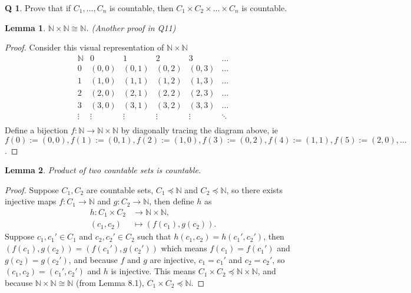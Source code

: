 \documentclass[12pt]{article}
\newtheorem{lemma}{Lemma}
\theoremstyle{definition}
\newtheorem{qn}{Q}
\numberwithin{equation}{qn}
\numberwithin{lemma}{qn}
\newcommand{\nat}{\mathbb{N}}
\renewcommand{\preceq}{\preccurlyeq}
\begin{document}
\begin{qn}
    Prove that if $C_1,\dots,C_n$ is countable, then $C_1\times C_2\times\dots\times C_n$ is countable.
\end{qn}
\begin{lemma}
    $\nat\times\nat \cong \nat$. (Another proof in Q11)
\end{lemma}
\begin{proof}
    Consider this visual representation of $\nat\times\nat$
    \[
    \begin{matrix}
        \nat &  0   & 1     & 2     & 3     & \dots    \\
        0   & (0,0) & (0,1) & (0,2) & (0,3) & \dots    \\
        1   & (1,0) & (1,1) & (1,2) & (1,3) & \dots    \\
        2   & (2,0) & (2,1) & (2,2) & (2,3) & \dots    \\
        3   & (3,0) & (3,1) & (3,2) & (3,3) & \dots    \\
        \vdots & \vdots & \vdots & \vdots & \vdots & \ddots    \\
    \end{matrix}
    \]
    Define a bijection $f:\nat\rightarrow \nat\times\nat$
    by diagonally tracing the diagram above, ie
    $f(0) := (0,0), f(1) := (0,1), f(2) := (1,0),
    f(3) := (0,2), f(4) := (1,1), f(5) := (2,0), \dots$.
\end{proof}
\begin{lemma}
    Product of two countable sets is countable.
\end{lemma}
\begin{proof}
    Suppose $C_1, C_2$ are countable sets, $C_1 \preceq \nat$ and $C_2 \preceq \nat$,
    so there exists injective maps
    $f: C_1\rightarrow \nat$ and $g: C_2 \rightarrow \nat$, then
    define $h$ as
    \begin{align*}
        h: C_1\times C_2 &\rightarrow \nat\times\nat,\\
        (c_1, c_2) &\mapsto (f(c_1), g(c_2)).
    \end{align*}
    Suppose $c_1, c_1'\in C_1$ and $c_2, c_2'\in C_2$ such that
    $h(c_1, c_2) = h(c_1', c_2')$, then $(f(c_1), g(c_2)) = (f(c_1'),g(c_2'))$
    which means $f(c_1) = f(c_1')$ and $g(c_2) = g(c_2')$, and because $f$ and $g$ are injective,
    $c_1 = c_1'$ and $c_2 = c_2'$, so $(c_1, c_2) = (c_1', c_2')$ and $h$ is injective.
    This means $C_1\times C_2\preceq \nat\times\nat$, and because $\nat\times\nat\cong\nat$ (from Lemma 8.1), $C_1\times C_2\preceq \nat$.
\end{proof}
\end{document}
